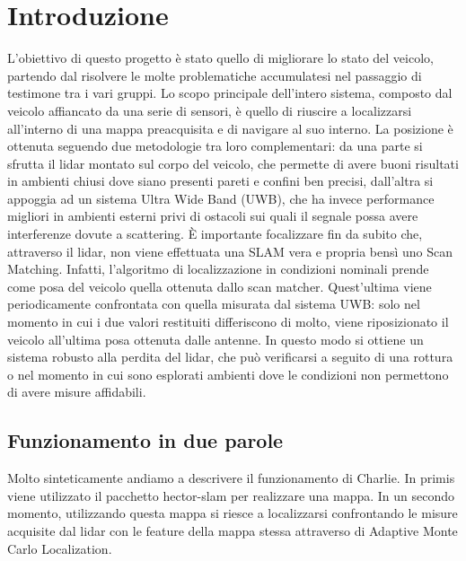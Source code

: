 
\graphicspath{{./figs/}}


	


\newpage\null\thispagestyle{empty}\newpage
\newpage
{}
\setcounter{page}{1}
\tableofcontents
\newpage

%
%


\section*{Introduzione}
L'obiettivo di questo progetto \`e stato quello di migliorare lo stato del veicolo, partendo dal risolvere le molte problematiche accumulatesi nel passaggio di testimone tra i vari gruppi.
Lo scopo principale dell'intero sistema, composto dal veicolo affiancato da una serie di sensori, \`e quello di riuscire a localizzarsi all'interno di una mappa preacquisita e di navigare al suo interno.
La posizione \`e ottenuta seguendo due metodologie tra loro complementari: da una parte si sfrutta il lidar montato sul corpo del veicolo, che permette di avere buoni risultati in ambienti chiusi dove siano presenti pareti e confini ben precisi, dall'altra si appoggia ad un sistema Ultra Wide Band (UWB), che ha invece performance migliori in ambienti esterni privi di ostacoli sui quali il segnale possa avere interferenze dovute a scattering.
\`E importante focalizzare fin da subito che, attraverso il lidar, non viene effettuata una SLAM vera e propria bens\`i uno Scan Matching.
Infatti, l'algoritmo di localizzazione in condizioni nominali prende come posa del veicolo quella ottenuta dallo scan matcher. 
Quest'ultima viene periodicamente confrontata con quella misurata dal sistema UWB: solo nel momento in cui i due valori restituiti differiscono di molto, viene riposizionato il veicolo all'ultima posa ottenuta dalle antenne.
In questo modo si ottiene un sistema robusto alla perdita del lidar, che pu\`o verificarsi a seguito di una rottura o nel momento in cui sono esplorati ambienti dove le condizioni non permettono di avere misure affidabili.

\subsection*{Funzionamento in due parole}
Molto sinteticamente andiamo a descrivere il funzionamento di Charlie. 
In primis viene utilizzato il pacchetto hector-slam per realizzare una mappa. 
In un secondo momento, utilizzando questa mappa si riesce a localizzarsi confrontando le misure acquisite dal lidar con le feature della mappa stessa attraverso di Adaptive Monte Carlo Localization. 

